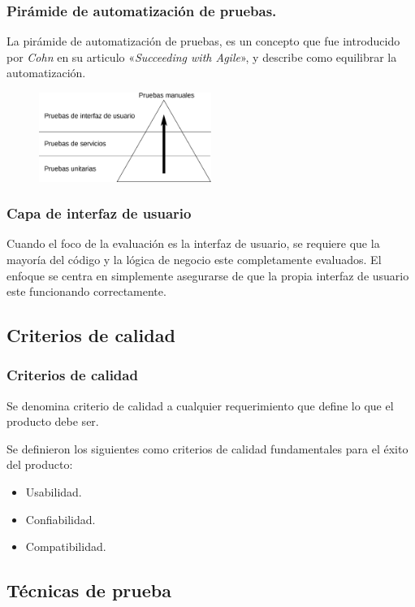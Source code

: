 \documentclass{beamer}
\begin{document}
\begin{frame}
\frametitle{Pirámide de automatización de pruebas.}
La pirámide de automatización de pruebas, es un concepto que fue introducido
por \emph{Cohn} en su articulo «\emph{Succeeding with Agile}», y describe como
equilibrar la automatización.
\begin{figure}
\centering
\includegraphics[width=0.5\textwidth]{graphics/pyramid.eps}
\end{figure}
\end{frame}

\begin{frame}
\frametitle{Capa de interfaz de usuario}
Cuando el foco de la evaluación es la interfaz de usuario, se requiere que la
mayoría del código y la lógica de negocio este completamente evaluados. El
enfoque se centra en simplemente asegurarse de que la propia interfaz de
usuario este funcionando correctamente.
\end{frame}

\subsection{Criterios de calidad}

\begin{frame}
\frametitle{Criterios de calidad}
Se denomina criterio de calidad a cualquier requerimiento que define lo que el
producto debe ser.

Se definieron los siguientes como criterios de calidad fundamentales para el
éxito del producto:

\begin{itemize}
\item Usabilidad.
\item Confiabilidad.
\item Compatibilidad.
\end{itemize}
\end{frame}

\subsection{Técnicas de prueba}
\end{document}

